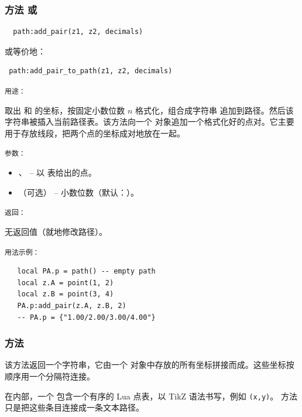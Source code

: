 \subsubsection{方法  或 }
\label{ssub:subsubsection_name}
\begin{verbatim}
  path:add_pair(z1, z2, decimals)
\end{verbatim}

或等价地：

\begin{verbatim}
 path:add_pair_to_path(z1, z2, decimals)
\end{verbatim}

\medskip
\texttt{用途： }

 取出  和  的坐标，按固定小数位数 $n$ 格式化，组合成字符串  追加到路径。然后该字符串被插入当前路径表。该方法向一个  对象追加一个格式化好的点对。它主要用于存放线段，把两个点的坐标成对地放在一起。

\medskip
\texttt{参数： }

\begin{itemize}
  \item {}、 – 以  表给出的点。
  \item {}（可选） – 小数位数（默认：）。
\end{itemize}

\medskip
\texttt{返回： }

无返回值（就地修改路径）。

\medskip
\texttt{用法示例： }

\begin{verbatim}
   local PA.p = path() -- empty path
   local z.A = point(1, 2)
   local z.B = point(3, 4)
   PA.p:add_pair(z.A, z.B, 2)
   -- PA.p = {"1.00/2.00/3.00/4.00"}
\end{verbatim}


\subsubsection{方法 }
\label{ssub:path_concat}

该方法返回一个字符串，它由一个  对象中存放的所有坐标拼接而成。这些坐标按顺序用一个分隔符连接。

\medskip
在内部，一个  包含一个有序的 Lua 点表，以 TikZ 语法书写，例如 \verb|(x,y)|。 方法只是把这些条目连接成一条文本路径。

